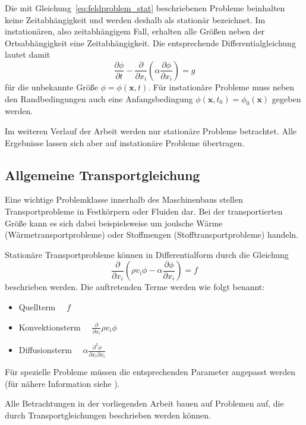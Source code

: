 Die mit Gleichung~\ref{eq:feldproblem_stat} beschriebenen Probleme beinhalten keine Zeitabhängigkeit
und werden deshalb als stationär bezeichnet.
Im instationären, also zeitabhängigem Fall, erhalten alle Größen neben der Ortsabhängigkeit
eine Zeitabhängigkeit. Die entsprechende Differentialgleichung lautet damit
\begin{equation}
  \frac{\partial \phi}{\partial t}
  -\frac{\partial}{\partial x_i}\left({\alpha \frac{\partial \phi}{\partial x_i} }\right)=g
  \label{eq:feldproblem_instat}
\end{equation}
für die unbekannte Größe $\phi=\phi(\mathbf{x}, t)$.
Für instationäre Probleme muss neben den Rand\-beding\-ungen auch eine Anfangsbedingung
$\phi(\mathbf{x}, t_0) = \phi_0(\mathbf{x})$ gegeben werden.

Im weiteren Verlauf der Arbeit werden nur stationäre Probleme betrachtet. Alle Ergebnisse
lassen sich aber auf instationäre Probleme übertragen.

\subsection{Allgemeine Transportgleichung}
\label{sec:transportgl}

Eine wichtige Problemklasse innerhalb des Maschinenbaus stellen Transportprobleme in
Festkörpern oder Fluiden dar. Bei der transportierten Größe kann es sich dabei beispielsweise
um joulsche Wärme (Wärmetransportprobleme) oder Stoffmengen (Stofftransportprobleme) handeln.

Stationäre Transportprobleme können in Differentialform durch die Gleichung
\begin{equation}
  \frac{\partial}{\partial x_i} \left({\rho v_i \phi
- \alpha \frac{\partial \phi}{\partial x_i} }\right) = f
\label{eq:transportgl}
\end{equation}
beschrieben werden. Die auftretenden Terme werden wie folgt benannt:
\begin{itemize}
  \item Quellterm $\quad f$
  \item Konvektionsterm $\quad\frac{\partial}{\partial x_i} \rho v_i \phi$
  \item Diffusionsterm $\quad\alpha \frac{\partial^2 \phi}{\partial x_i \partial x_i}$
\end{itemize}
Für spezielle Probleme müssen die entsprechenden Parameter angepasst werden
(für nähere Information siehe \cite{num_maschbau}).

Alle Betrachtungen in der vorliegenden Arbeit bauen auf Problemen auf, die durch
Transport\-gleich\-ungen beschrieben werden können.

